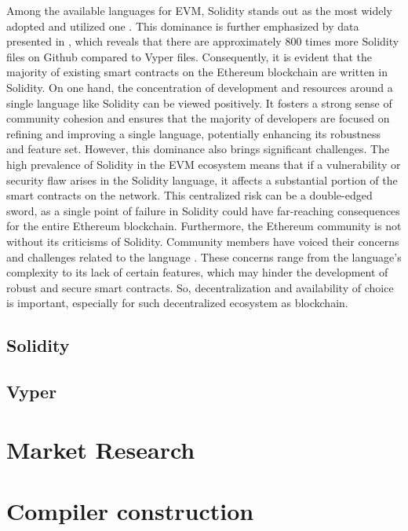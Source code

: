 Among the available languages for EVM, Solidity stands out as the most widely adopted and utilized one \cite{SolidityWidelyUsed, SolidityDevsChallenges}. This dominance is further emphasized by data presented in \cite{SolidityVyperGithubUsage}, which reveals that there are approximately 800 times more Solidity files on Github compared to Vyper files. Consequently, it is evident that the majority of existing smart contracts on the Ethereum blockchain are written in Solidity. On one hand, the concentration of development and resources around a single language like Solidity can be viewed positively. It fosters a strong sense of community cohesion and ensures that the majority of developers are focused on refining and improving a single language, potentially enhancing its robustness and feature set. However, this dominance also brings significant challenges. The high prevalence of Solidity in the EVM ecosystem means that if a vulnerability or security flaw arises in the Solidity language, it affects a substantial portion of the smart contracts on the network. This centralized risk can be a double-edged sword, as a single point of failure in Solidity could have far-reaching consequences for the entire Ethereum blockchain. Furthermore, the Ethereum community is not without its criticisms of Solidity. Community members have voiced their concerns and challenges related to the language \cite{SolidityDevsChallenges}. These concerns range from the language's complexity to its lack of certain features, which may hinder the development of robust and secure smart contracts. So, decentralization and availability of choice is important, especially for such decentralized ecosystem as blockchain.

\subsection{Solidity}

\subsection{Vyper}

\section{Market Research}

\section{Compiler construction}

